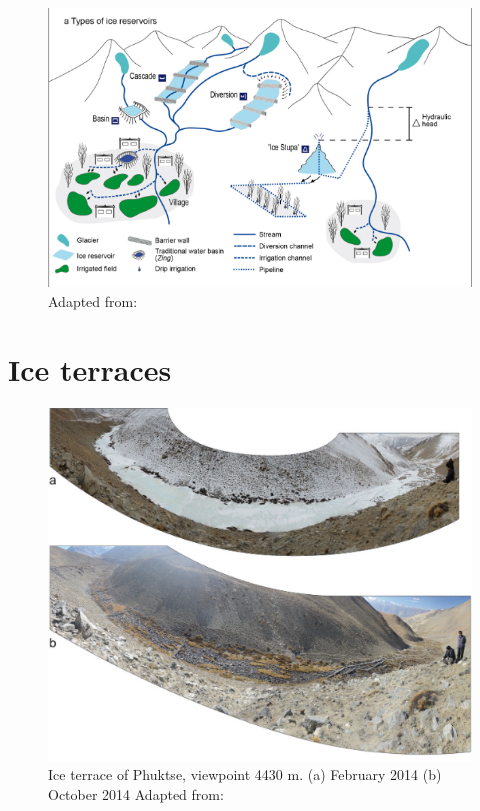 \begin{figure}[htb]
\centering
\includegraphics[width=12cm]{figs/AIR_designs.png}

\caption{Adapted from: \cite{nusserSociohydrologyArtificialGlaciers2019}}

\label{fig:AIRdesigns}
\end{figure}

\section{Ice terraces}

\begin{figure}[t]
\centering
\includegraphics[width=12cm]{figs/IT_example.png}

\caption{Ice terrace of Phuktse, viewpoint 4430 m. (a) February 2014 (b) October 2014 Adapted from: \cite{nusserSociohydrologyArtificialGlaciers2019}}

\label{fig:ITexample}
\end{figure}

